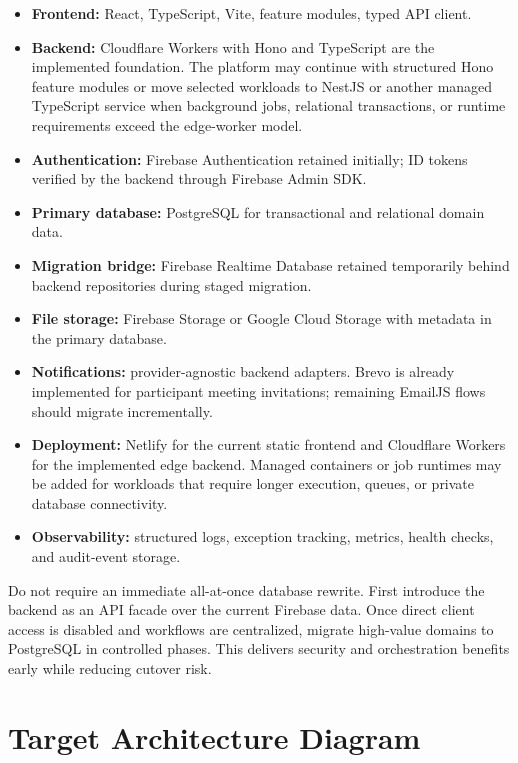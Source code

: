 \documentclass[11pt,a4paper,oneside]{report}
\begin{document}
\begin{itemize}
  \item \textbf{Frontend:} React, TypeScript, Vite, feature modules, typed API client.
  \item \textbf{Backend:} Cloudflare Workers with Hono and TypeScript are the implemented foundation. The platform may continue with structured Hono feature modules or move selected workloads to NestJS or another managed TypeScript service when background jobs, relational transactions, or runtime requirements exceed the edge-worker model.
  \item \textbf{Authentication:} Firebase Authentication retained initially; ID tokens verified by the backend through Firebase Admin SDK.
  \item \textbf{Primary database:} PostgreSQL for transactional and relational domain data.
  \item \textbf{Migration bridge:} Firebase Realtime Database retained temporarily behind backend repositories during staged migration.
  \item \textbf{File storage:} Firebase Storage or Google Cloud Storage with metadata in the primary database.
  \item \textbf{Notifications:} provider-agnostic backend adapters. Brevo is already implemented for participant meeting invitations; remaining EmailJS flows should migrate incrementally.
  \item \textbf{Deployment:} Netlify for the current static frontend and Cloudflare Workers for the implemented edge backend. Managed containers or job runtimes may be added for workloads that require longer execution, queues, or private database connectivity.
  \item \textbf{Observability:} structured logs, exception tracking, metrics, health checks, and audit-event storage.
\end{itemize}

\begin{decisionbox}
Do not require an immediate all-at-once database rewrite. First introduce the backend as an API facade over the current Firebase data. Once direct client access is disabled and workflows are centralized, migrate high-value domains to PostgreSQL in controlled phases. This delivers security and orchestration benefits early while reducing cutover risk.
\end{decisionbox}

\section{Target Architecture Diagram}
\end{document}

